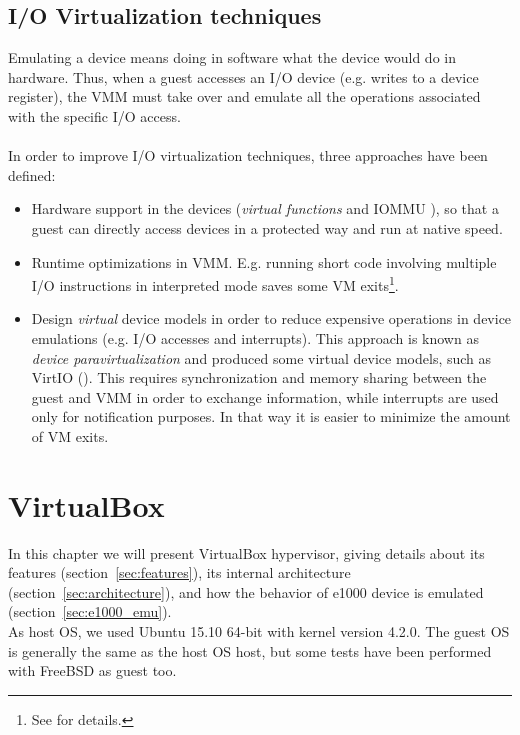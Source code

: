 \documentclass[a4paper, 12pt, titlepage]{report}
\begin{document}
\section{I/O Virtualization techniques}
Emulating a device means doing in software what the device would do in hardware. Thus, when a guest accesses an I/O device (e.g. writes to a device register), the VMM must take over and emulate all the operations associated with the specific I/O access.
\\
\\
In order to improve I/O virtualization techniques, three approaches have been defined:
\begin{itemize}
\item Hardware support in the devices (\textit{virtual functions} and IOMMU \cite{iommu}), so that a guest can directly access devices in a protected way and run at native speed.
\item Runtime optimizations in VMM. E.g. running short code involving multiple I/O instructions in interpreted mode saves some VM exits\footnote{See \cite{vmm_opt} for details.}.
\item Design \textit{virtual} device models in order to reduce expensive operations in device emulations (e.g. I/O accesses and interrupts). This approach is known as \textit{device paravirtualization} and produced some virtual device models, such as VirtIO (\cite{virtio}).
This requires synchronization and memory sharing between the guest and VMM in order to exchange information, while interrupts are used only for notification purposes. In that way it is easier to minimize the amount of VM exits.
\end{itemize}
\chapter{VirtualBox}
In this chapter we will present VirtualBox hypervisor, giving details about its features (section~\ref{sec:features}), its internal architecture (section~\ref{sec:architecture}), and how the behavior of e1000 device is emulated (section~\ref{sec:e1000_emu}).
\\
As host OS, we used Ubuntu 15.10 64-bit with kernel version 4.2.0. The guest OS is generally the same as the host OS host, but some tests have been performed with FreeBSD as guest too.
\end{document}
